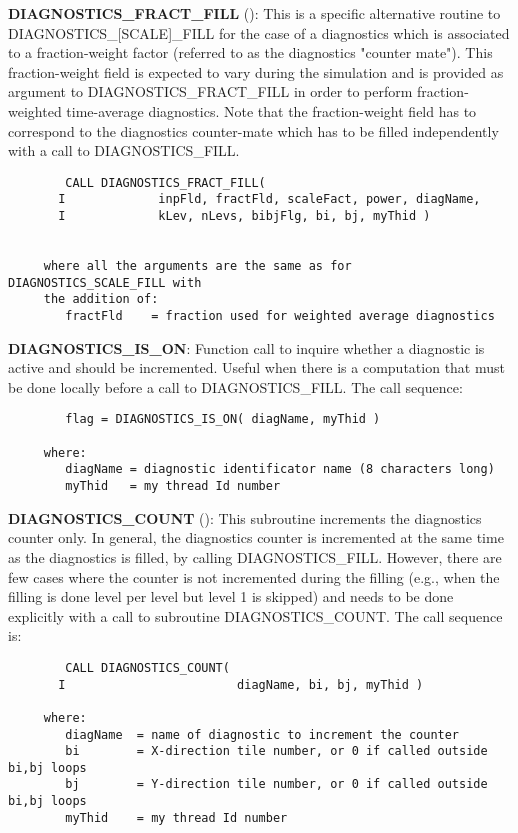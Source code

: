 \noindent
{\bf DIAGNOSTICS\_FRACT\_FILL}
():
This is a specific alternative routine to DIAGNOSTICS\_[SCALE]\_FILL
for the case of a diagnostics which is associated to
a fraction-weight factor (referred to as the diagnostics "counter mate").
This fraction-weight field is expected to vary during the simulation
and is provided as argument to DIAGNOSTICS\_FRACT\_FILL
in order to perform fraction-weighted time-average diagnostics.
Note that the fraction-weight field has to correspond to the diagnostics
counter-mate which has to be filled independently with a call to DIAGNOSTICS\_FILL.

\begin{verbatim}
        CALL DIAGNOSTICS_FRACT_FILL(
       I             inpFld, fractFld, scaleFact, power, diagName,
       I             kLev, nLevs, bibjFlg, bi, bj, myThid )


     where all the arguments are the same as for DIAGNOSTICS_SCALE_FILL with
     the addition of:
        fractFld    = fraction used for weighted average diagnostics
\end{verbatim}

\noindent
{\bf DIAGNOSTICS\_IS\_ON}: Function call to inquire whether a
diagnostic is active and should be incremented. Useful when there is a
computation that must be done locally before a call to
DIAGNOSTICS\_FILL. The call sequence:

\begin{verbatim}
        flag = DIAGNOSTICS_IS_ON( diagName, myThid )

     where:
        diagName = diagnostic identificator name (8 characters long)
        myThid   = my thread Id number
\end{verbatim}

\noindent
{\bf DIAGNOSTICS\_COUNT}
():
This subroutine increments the diagnostics counter only.
In general, the diagnostics counter is incremented at the same time as the
diagnostics is filled, by calling DIAGNOSTICS\_FILL.
However, there are few cases where the counter is not incremented
during the filling (e.g., when the filling is done level per level but
level 1 is skipped) and needs to be done explicitly with a call to subroutine
DIAGNOSTICS\_COUNT. The call sequence is:

\begin{verbatim}
        CALL DIAGNOSTICS_COUNT(
       I                        diagName, bi, bj, myThid )

     where:
        diagName  = name of diagnostic to increment the counter
        bi        = X-direction tile number, or 0 if called outside bi,bj loops
        bj        = Y-direction tile number, or 0 if called outside bi,bj loops
        myThid    = my thread Id number

\end{verbatim}


